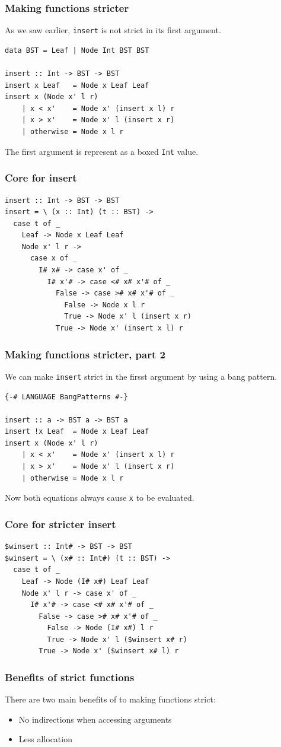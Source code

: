 \documentclass{beamer}
\begin{document}
\begin{frame}[fragile]
  \frametitle{Making functions stricter}

  As we saw earlier, \lstinline!insert! is not strict in its first
  argument.
  \begin{lstlisting}
data BST = Leaf | Node Int BST BST

insert :: Int -> BST -> BST
insert x Leaf   = Node x Leaf Leaf
insert x (Node x' l r)
    | x < x'    = Node x' (insert x l) r
    | x > x'    = Node x' l (insert x r)
    | otherwise = Node x l r
  \end{lstlisting}
  The first argument is represent as a boxed \lstinline!Int! value.
\end{frame}

\begin{frame}[fragile]
  \frametitle{Core for insert}

  \begin{verbatim}
insert :: Int -> BST -> BST
insert = \ (x :: Int) (t :: BST) ->
  case t of _
    Leaf -> Node x Leaf Leaf
    Node x' l r ->
      case x of _
        I# x# -> case x' of _
          I# x'# -> case <# x# x'# of _
            False -> case ># x# x'# of _
              False -> Node x l r
              True -> Node x' l (insert x r)
            True -> Node x' (insert x l) r
  \end{verbatim}
\end{frame}

\begin{frame}[fragile]
  \frametitle{Making functions stricter, part 2}

  We can make \lstinline!insert! strict in the firsst argument by
  using a bang pattern.
  \begin{lstlisting}
{-# LANGUAGE BangPatterns #-}

insert :: a -> BST a -> BST a
insert !x Leaf  = Node x Leaf Leaf
insert x (Node x' l r)
    | x < x'    = Node x' (insert x l) r
    | x > x'    = Node x' l (insert x r)
    | otherwise = Node x l r
  \end{lstlisting}
  Now both equations always cause \lstinline!x! to be evaluated.
\end{frame}

\begin{frame}[fragile]
  \frametitle{Core for stricter insert}

  \begin{verbatim}
$winsert :: Int# -> BST -> BST
$winsert = \ (x# :: Int#) (t :: BST) ->
  case t of _
    Leaf -> Node (I# x#) Leaf Leaf
    Node x' l r -> case x' of _
      I# x'# -> case <# x# x'# of _
        False -> case ># x# x'# of _
          False -> Node (I# x#) l r
          True -> Node x' l ($winsert x# r)
        True -> Node x' ($winsert x# l) r
  \end{verbatim}
\end{frame}

\begin{frame}[fragile]
  \frametitle{Benefits of strict functions}

  There are two main benefits of to making functions strict:
  \begin{itemize}
  \item No indirections when accessing arguments
  \item Less allocation
  \end{itemize}
\end{frame}
\end{document}
